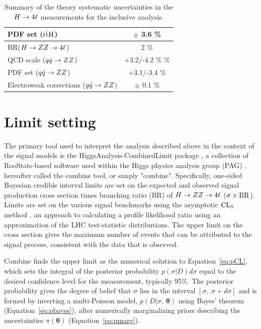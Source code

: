 \begin{table}[!htb]
\begin{center}
\begin{tabular}{l|c}
PDF set (${\rm t\bar{t}H}$) & $\pm$ 3.6 \% \\
\hline
BR($H\to ZZ\to4\ell$) & 2 \% \\
\hline
QCD scale ($q\bar{q}\to ZZ$) & +3.2/-4.2 \% \% \\
PDF set ($q\bar{q}\to ZZ$) & +3.1/-3.4 \% \\
Electroweak corrections ($q\bar{q}\to ZZ$) & $\pm$ 0.1 \% \\
\hline %
\end{tabular}
\caption{Summary of the theory systematic uncertainties in the $H\to4\ell$ measurements for the inclusive analysis.
\label{tab:SystOverviewTheo}
}
\normalsize
\end{center}
\end{table}
 
\section{Limit setting}

The primary tool used to interpret the analysis described above in the context of the signal models is the HiggsAnalysis-CombinedLimit package \cite{combinetwiki}, a collection of RooStats-based software \cite{roostatstwiki} used within the Higgs physics analysis group (PAG) \cite{higgspagtwiki}, hereafter called the combine tool, or simply "combine". Specifically, one-sided Bayesian credible interval limits are set on the expected and observed signal production cross section times branching ratio (BR) of $H\to ZZ\to4\ell$ ($\sigma\times \rm{BR}$). Limits are set on the various signal benchmarks using the asymptotic $\rm{CL}_S$ method \cite{Cowan:2010js}, an approach to calculating a profile likelihood ratio using an approximation of the LHC test-statistic distributions. The upper limit on the cross section gives the maximum number of events that can be attributed to the signal process, consistent with the data that is observed. 

Combine finds the upper limit as the numerical solution to Equation~\ref{eq:pCL}, which sets the integral of the posterior probability $p(\sigma|D)d\sigma$ equal to the desired confidence level for the measurement, typically 95\%. The posterior probability gives the degree of belief that $\sigma$ lies in the interval $[\sigma,\ \sigma+d\sigma]$ and is formed by inverting a multi-Poisson model, $p(D|\sigma,\ \bm{\theta})$ using Bayes' theorem (Equation~\ref{eq:pbayes}), after numerically marginalizing priors describing the uncertainties $\pi(\bm{\theta})$ (Equation~\ref{eq:pmarg}).

